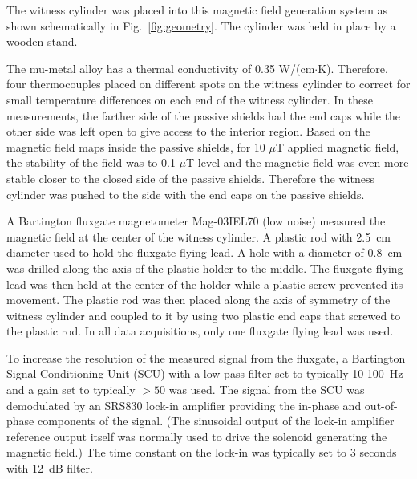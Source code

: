 The witness cylinder was placed into this magnetic field generation
system as shown schematically in Fig.~\ref{fig:geometry}.  The
cylinder was held in place by a wooden stand.


The mu-metal alloy has a thermal conductivity of 0.35
W/(cm$\cdot$K). Therefore, four thermocouples placed on different
spots on the witness cylinder to correct for small temperature
differences on each end of the witness cylinder.  In these
measurements, the farther side of the passive shields had the end caps
while the other side was left open to give access to the interior
region. Based on the magnetic field maps inside the passive shields,
for 10 $\mu$T applied magnetic field, the stability of the field was
to 0.1 $\mu$T level and the magnetic field was even more stable closer
to the closed side of the passive shields. Therefore the witness
cylinder was pushed to the side with the end caps on the passive
shields.


A Bartington fluxgate magnetometer Mag-03IEL70 (low noise) measured
the magnetic field at the center of the witness cylinder. A plastic
rod with 2.5~cm diameter used to hold the fluxgate flying lead. A hole
with a diameter of 0.8~cm was drilled along the axis of the plastic
holder to the middle. The fluxgate flying lead was then held at the
center of the holder while a plastic screw prevented its movement. The
plastic rod was then placed along the axis of symmetry of the witness
cylinder and coupled to it by using two plastic end caps that screwed
to the plastic rod.  In all data acquisitions, only one fluxgate
flying lead was used.





To increase the resolution of the measured signal from the fluxgate, a
Bartington Signal Conditioning Unit (SCU) with a low-pass filter set
to typically 10-100~Hz and a gain set to typically $>50$ was used.
The signal from the SCU was demodulated by an SRS830 lock-in amplifier
providing the in-phase and out-of-phase components of the signal.
(The sinusoidal output of the lock-in amplifier reference output
itself was normally used to drive the solenoid generating the magnetic
field.)  The time constant on the lock-in was typically set to 3
seconds with 12~dB filter.

